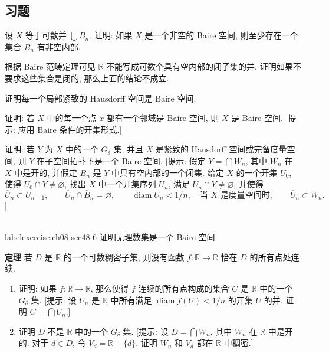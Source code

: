 \subsection*{习题}

\begin{exercise}
设 $X$ 等于可数并 $\bigcup B_n$. 证明: 如果 $X$ 是一个非空的 Baire 空间, 则至少存在一个集合 $\overline{B}_n$ 有非空内部.
\end{exercise}

\begin{exercise}
根据 Baire 范畴定理可见 $\mathbb{R}$ 不能写成可数个具有空内部的闭子集的并. 证明如果不要求这些集合是闭的, 那么上面的结论不成立.
\end{exercise}

\begin{exercise}
证明每一个局部紧致的 Hausdorff 空间是 Baire 空间.
\end{exercise}

\begin{exercise}
证明: 若 $X$ 中的每一个点 $x$ 都有一个邻域是 Baire 空间, 则 $X$ 是 Baire 空间. [提示: 应用 Baire 条件的开集形式.]
\end{exercise}

\begin{exercise}
证明: 若 $Y$ 为 $X$ 中的一个 $G_\delta$ 集, 并且 $X$ 是紧致的 Hausdorff 空间或完备度量空间, 则 $Y$ 在子空间拓扑下是一个 Baire 空间. [提示: 假定 $Y=\bigcap W_n$, 其中 $W_n$ 在 $X$ 中是开的, 并假定 $B_n$ 是 $Y$ 中具有空内部的一个闭集. 给定 $X$ 的一个开集 $U_0$, 使得 $U_0\cap Y\neq\varnothing$, 找出 $X$ 中一个开集序列 $U_n$, 满足 $U_n\cap Y\neq\varnothing$, 并使得
\[
\overline{U}_{n}\subset U_{n-1},\qquad
\overline{U}_{n}\cap\overline{B}_{n}=\varnothing,\qquad
\operatorname{diam}U_{n}<1/n,\quad\text{当 }X\text{ 是度量空间时},\qquad
\overline{U}_{n}\subset W_{n}.
\]
]
\end{exercise}

\begin{exercise}
\\label{exercise:ch08-sec48-6}
证明无理数集是一个 Baire 空间.
\end{exercise}

\begin{exercise}
\textbf{定理} 若 $D$ 是 $\mathbb{R}$ 的一个可数稠密子集, 则没有函数 $f\colon\mathbb{R}\to\mathbb{R}$ 恰在 $D$ 的所有点处连续.
\begin{enumerate}
\item 证明: 如果 $f\colon\mathbb{R}\to\mathbb{R}$, 那么使得 $f$ 连续的所有点构成的集合 $C$ 是 $\mathbb{R}$ 中的一个 $G_\delta$ 集. [提示: 设 $U_n$ 是 $\mathbb{R}$ 中所有满足 $\operatorname{diam}f(U)<1/n$ 的开集 $U$ 的并, 证明 $C=\bigcap U_n$.]
\item 证明 $D$ 不是 $\mathbb{R}$ 中的一个 $G_\delta$ 集. [提示: 设 $D=\bigcap W_n$, 其中 $W_n$ 在 $\mathbb{R}$ 中是开的. 对于 $d\in D$, 令 $V_d=\mathbb{R}-\{d\}$. 证明 $W_n$ 和 $V_d$ 都在 $\mathbb{R}$ 中稠密.]
\end{enumerate}
\end{exercise}

